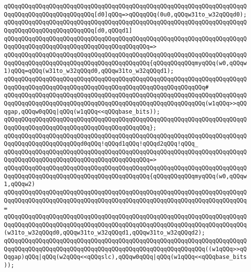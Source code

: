 \verb|qQQqqQQqqQQqqQQqqQQqqQQqqQQqqQQqqQQqqQQqqQQqqQQqqQQqqQQqqQQqqQQqqQQqqQQqqQQqqQQqqQQqqQQqqQQqqQQq[d0]qQQq=>qQQqqQQq(0u0,qQQqw31to_w32qQQqd0);|\newline
\newline
\verb|qQQqqQQqqQQqqQQqqQQqqQQqqQQqqQQqqQQqqQQqqQQqqQQqqQQqqQQqqQQqqQQqqQQqqQQqqQQqqQQqqQQqqQQqqQQqqQQq[d0,qQQqd1]|\newline
\verb|qQQqqQQqqQQqqQQqqQQqqQQqqQQqqQQqqQQqqQQqqQQqqQQqqQQqqQQqqQQqqQQqqQQqqQQqqQQqqQQqqQQqqQQqqQQqqQQqqQQqqQQqqQQqqQQq=>|\newline
\verb|qQQqqQQqqQQqqQQqqQQqqQQqqQQqqQQqqQQqqQQqqQQqqQQqqQQqqQQqqQQqqQQqqQQqqQQqqQQqqQQqqQQqqQQqqQQqqQQqqQQqqQQqqQQqqQQq{qQQqqQQqqQQqmyqQQq(w0,qQQqw1)qQQq=qQQq(w31to_w32qQQqd0,qQQqw31to_w32qQQqd1);|\newline
\verb|qQQqqQQqqQQqqQQqqQQqqQQqqQQqqQQqqQQqqQQqqQQqqQQqqQQqqQQqqQQqqQQqqQQqqQQqqQQqqQQqqQQqqQQqqQQqqQQqqQQqqQQqqQQqqQQqqQQqqQQqqQQqqQQq#|\newline
\verb|qQQqqQQqqQQqqQQqqQQqqQQqqQQqqQQqqQQqqQQqqQQqqQQqqQQqqQQqqQQqqQQqqQQqqQQqqQQqqQQqqQQqqQQqqQQqqQQqqQQqqQQqqQQqqQQqqQQqqQQqqQQqqQQq(w1qQQq>>qQQqgap,qQQqw0qQQq|\verb#|qQQq(w1qQQq<<qQQqbase_bits));#\newline
\verb|qQQqqQQqqQQqqQQqqQQqqQQqqQQqqQQqqQQqqQQqqQQqqQQqqQQqqQQqqQQqqQQqqQQqqQQqqQQqqQQqqQQqqQQqqQQqqQQqqQQqqQQqqQQqqQQq};|\newline
\newline
\verb|qQQqqQQqqQQqqQQqqQQqqQQqqQQqqQQqqQQqqQQqqQQqqQQqqQQqqQQqqQQqqQQqqQQqqQQqqQQqqQQqqQQqqQQqqQQqd0qQQq!qQQqd1qQQq!qQQqd2qQQq!qQQq_|\newline
\verb|qQQqqQQqqQQqqQQqqQQqqQQqqQQqqQQqqQQqqQQqqQQqqQQqqQQqqQQqqQQqqQQqqQQqqQQqqQQqqQQqqQQqqQQqqQQqqQQqqQQqqQQqqQQqqQQq=>|\newline
\verb|qQQqqQQqqQQqqQQqqQQqqQQqqQQqqQQqqQQqqQQqqQQqqQQqqQQqqQQqqQQqqQQqqQQqqQQqqQQqqQQqqQQqqQQqqQQqqQQqqQQqqQQqqQQqqQQq{qQQqqQQqqQQqmyqQQq(w0,qQQqw1,qQQqw2)|\newline
\verb|qQQqqQQqqQQqqQQqqQQqqQQqqQQqqQQqqQQqqQQqqQQqqQQqqQQqqQQqqQQqqQQqqQQqqQQqqQQqqQQqqQQqqQQqqQQqqQQqqQQqqQQqqQQqqQQqqQQqqQQqqQQqqQQqqQQqqQQqqQQq=|\newline
\verb|qQQqqQQqqQQqqQQqqQQqqQQqqQQqqQQqqQQqqQQqqQQqqQQqqQQqqQQqqQQqqQQqqQQqqQQqqQQqqQQqqQQqqQQqqQQqqQQqqQQqqQQqqQQqqQQqqQQqqQQqqQQqqQQqqQQqqQQqqQQq(w31to_w32qQQqd0,qQQqw31to_w32qQQqd1,qQQqw31to_w32qQQqd2);|\newline
\newline
\verb|qQQqqQQqqQQqqQQqqQQqqQQqqQQqqQQqqQQqqQQqqQQqqQQqqQQqqQQqqQQqqQQqqQQqqQQqqQQqqQQqqQQqqQQqqQQqqQQqqQQqqQQqqQQqqQQqqQQqqQQqqQQqqQQq((w1qQQq>>qQQqgap)qQQq|\verb#|qQQq(w2qQQq<<qQQqslc),qQQqw0qQQq|qQQq(w1qQQq<<qQQqbase_bits));#\newline
